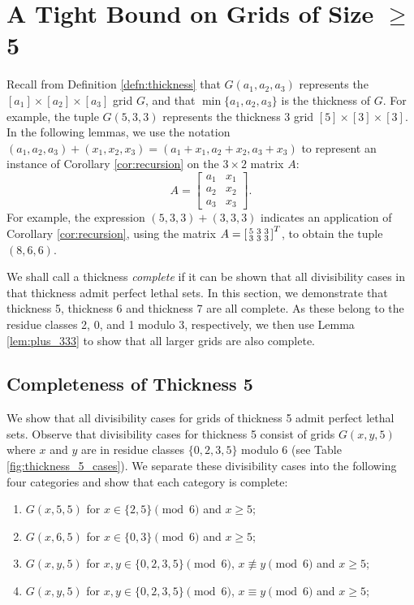 \chapter{A Tight Bound on Grids of Size $\geq$ 5}

Recall from Definition \ref{defn:thickness} that $G(a_1,a_2,a_3)$ represents the $[a_1] \times [a_2] \times [a_3]$ grid $G$, and that $\min\{a_1,a_2,a_3\}$ is the thickness of $G$. For example, the tuple $G(5,3,3)$ represents the thickness 3 grid $[5] \times [3] \times [3]$. In the following lemmas, we use the notation $(a_1,a_2,a_3)+(x_1,x_2,x_3) = (a_1+x_1, a_2+x_2, a_3+x_3)$ to represent an instance of Corollary \ref{cor:recursion} on the $3 \times 2$ matrix $A$:
$$A =
\begin{bmatrix}
a_1 & x_1 \\
a_2 & x_2 \\
a_3 & x_3
\end{bmatrix}.
$$
For example, the expression $(5,3,3) + (3,3,3)$ indicates an application of Corollary \ref{cor:recursion}, using the matrix $A = \begin{bsmallmatrix} 5&3&3 \\ 3&3&3 \end{bsmallmatrix}^T$, to obtain the tuple $(8,6,6)$. 

We shall call a thickness \emph{complete} if it can be shown that all divisibility cases in that thickness admit perfect lethal sets. In this section, we demonstrate that thickness 5, thickness 6 and thickness 7 are all complete. As these belong to the residue classes 2, 0, and 1 modulo 3, respectively, we then use Lemma \ref{lem:plus_333} to show that all larger grids are also complete. 

\section{Completeness of Thickness 5}
We show that all divisibility cases for grids of thickness 5 admit perfect lethal sets. Observe that divisibility cases for thickness 5 consist of grids $G(x,y,5)$ where $x$ and $y$ are in residue classes $\{0,2,3,5\}$ modulo 6 (see Table \ref{fig:thickness_5_cases}). We separate these divisibility cases into the following four categories and show that each category is complete:

\begin{enumerate}
\item $G(x,5,5)$ for $x \in \{2,5\} \pmod 6$ and $x \geq 5$;
\item $G(x,6,5)$ for $x \in \{0,3\} \pmod 6$ and $x \geq 5$;
\item $G(x,y,5)$ for $x,y \in \{0,2,3,5\} \pmod 6$, $x \not\equiv y \pmod 6$ and $x \geq 5$;
\item $G(x,y,5)$ for $x,y \in \{0,2,3,5\} \pmod 6$, $x \equiv y \pmod 6$ and $x \geq 5$;
\end{enumerate}

